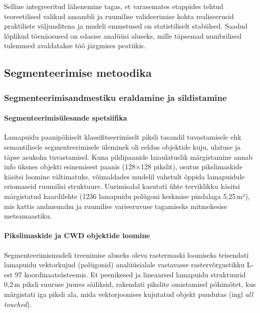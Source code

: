     Selline integreeritud lähenemine tagas, et varasemates etappides tehtud teoreetilised valikud ansambli ja ruumilise valideerimise kohta realiseerusid praktiliste väljunditena ja mudeli ennustused on statistiliselt stabiilsed. Saadud lõplikud tõenäosused on edasise analüüsi aluseks, mille täpsemad numbrilised tulemused avaldatakse töö järgmises peatükis.


\subsection{Segmenteerimise metoodika}
\label{subsec:metoodika-segmenteerimine}

    \subsubsection{Segmenteerimisandmestiku eraldamine ja sildistamine}

    \paragraph{Segmenteerimisülesande spetsiifika}
    Lamapuidu paanipõhiselt klassifitseerimiselt piksli tasandil tuvastamisele ehk semantilisele segmenteerimisele üleminek oli eeldus objektide kuju, ulatuse ja täpse asukoha tuvastamisel. Kuna pildipaanide laiaulatuslik märgistamine annab info üksnes objekti esinemisest paanis (128$\times$128 pikslit), osutus pikslimaskide käsitsi loomine vältimatuks, võimaldades mudelil vahetult õppida lamapuidule eriomaseid ruumilisi struktuure. Uurimisalal kasutati ühte terviklikku käsitsi märgistatud kaardilehte (1236 lamapuidu polügoni keskmise pindalaga 5,25\,m²), mis kattis andmemahu ja ruumilise varieeruvuse tagamiseks mitmekesise metsamaastiku.

    \paragraph{Pikslimaskide ja CWD objektide loomine}
    Segmenteerimismudeli treenimise aluseks oleva rastermaski loomiseks teisendati lamapuidu vektorkujud (polügonid) analüüsialale vastavasse rastervõrgustikku L-est 97 koordinaatsüsteemis. Et peenikesed ja lineaarsed lamapuidu struktuurid 0,2\,m piksli suuruse juures säiliksid, rakendati pikslite omistamisel põhimõtet, kus märgistati iga piksli ala, mida vektorjoonises kujutatud objekt puudutas (ingl \textit{all touched}).
    
